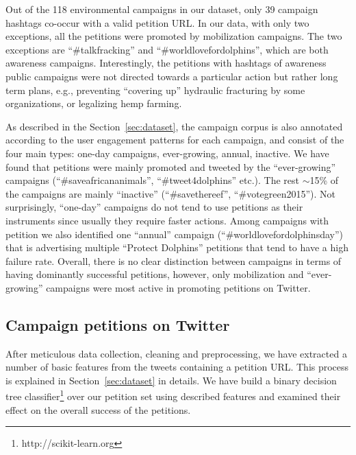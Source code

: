 Out of the 118 environmental campaigns in our dataset, only 39 campaign hashtags co-occur with a valid petition URL.
In our data, with only two exceptions, all the petitions were promoted by mobilization campaigns. The two exceptions are ``\#talkfracking'' and ``\#worldlovefordolphins'', which are both awareness campaigns.
Interestingly, the petitions with hashtags of awareness public campaigns were not directed towards a particular action but rather long term plans, e.g., preventing ``covering up'' hydraulic fracturing by some organizations, or legalizing hemp farming.

As described in the Section~\ref{sec:dataset}, the campaign corpus is also annotated according to the user engagement patterns for each campaign, and consist of the four main types: one-day campaigns, ever-growing, annual, inactive.
We have found that petitions were mainly promoted and tweeted by the ``ever-growing'' campaigns (``\#saveafricananimals'', ``\#tweet4dolphins'' etc.).
The rest $\sim$15\% of the campaigns are mainly ``inactive'' (``\#savethereef'', ``\#votegreen2015'').
Not surprisingly, ``one-day'' campaigns do not tend to use petitions as their instruments since usually they require faster actions.
Among campaigns with petition we also identified one ``annual'' campaign (``\#worldlovefordolphinsday'') that is advertising multiple ``Protect Dolphins'' petitions that tend to have a high failure rate.
Overall, there is no clear distinction between campaigns in terms of having dominantly successful petitions, however, only mobilization and ``ever-growing'' campaigns were most active in promoting petitions on Twitter.

\subsection{Campaign petitions on Twitter}
After meticulous data collection, cleaning and preprocessing, we have extracted a number of basic features from the tweets containing a petition URL.
This process is explained in Section~\ref{sec:dataset} in details.
We have build a binary decision tree classifier\footnote{ http://scikit-learn.org } over our petition set using described features and examined their effect on the overall success of the petitions.

